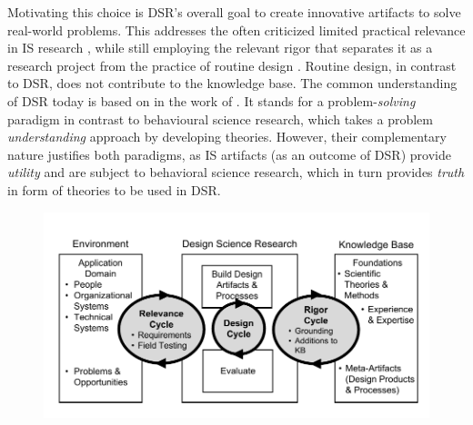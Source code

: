 Motivating this choice is \acrshort{DSR}'s overall goal to create innovative artifacts to solve real-world problems. This addresses the often criticized limited practical relevance in \acrshort{IS} research \citep{hirschheim}, while still employing the relevant rigor that separates it as a research project from the practice of routine design \citep{Winter2008Hevner}. Routine design, in contrast to \acrshort{DSR}, does not contribute to the knowledge base. The common understanding of \acrshort{DSR} today is based on in the work of \cite{Hevner2004}. It stands for a problem-\textit{solving} paradigm in contrast to behavioural science research, which takes a problem \textit{understanding} approach by developing theories. However, their complementary nature justifies both paradigms, as IS artifacts (as an outcome of \acrshort{DSR}) provide \textit{utility} and are subject to behavioral science research, which in turn provides \textit{truth} in form of theories to be used in \acrshort{DSR}.

			
\begin{figure}[caption={Design science research cycles}, label={fig:dsr}]
	{	\includegraphics[width=.8\textwidth]{figures/dsr.pdf}
	} \\
\parbox{0.8\textwidth}{}
\end{figure}


